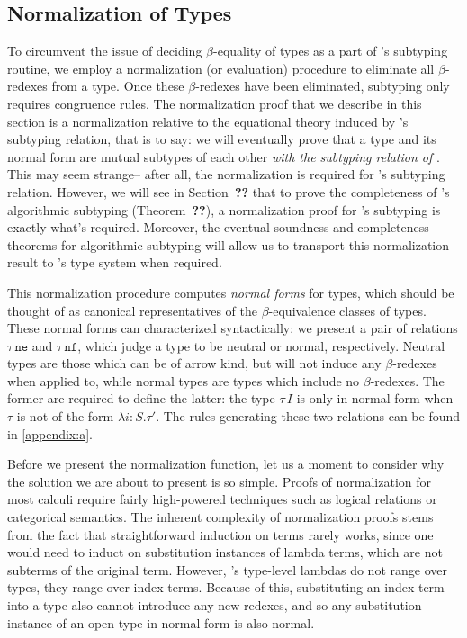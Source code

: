 \subsection{Normalization of Types}
\label{sec:dlambdaamor-normalization}
To circumvent the issue of deciding $\beta$-equality of types as a part of \bilambdaamor's subtyping routine, we employ a normalization (or evaluation) procedure to eliminate all $\beta$-redexes from a type. Once these $\beta$-redexes have been eliminated, subtyping only requires congruence rules. The normalization proof that we describe in this section is a normalization relative to the equational theory induced by \dlambdaamor's subtyping relation, that is to say: we will eventually prove that a type and its normal form are mutual subtypes of each other \textit{with the subtyping relation of \dlambdaamor}. This may seem strange-- after all, the normalization is required for \bilambdaamor's subtyping relation. However, we will see in Section~\textbf{??} that to prove the completeness of \bilambdaamor's algorithmic subtyping (Theorem~\textbf{??}), a normalization proof for \dlambdaamor's subtyping is exactly what's required. Moreover, the eventual soundness and completeness theorems for algorithmic subtyping will allow us to transport this normalization result to \bilambdaamor's type system when required.

This normalization procedure computes \textit{normal forms} for types, which should be thought of as canonical representatives of the $\beta$-equivalence classes of types. These normal forms can characterized syntactically: we present a pair of relations $\tau \, \texttt{ne}$ and $\tau \, \texttt{nf}$, which judge a type to be neutral or normal, respectively. Neutral types are those which can be of arrow kind, but will not induce any $\beta$-redexes when applied to, while normal types are types which include no $\beta$-redexes. The former are required to define the latter: the type $\tau \, I$ is only in normal form when $\tau$ is not of the form $\lambda i : S.\tau'$. The rules generating these two relations can be found in \autoref{appendix:a}.

Before we present the normalization function, let us a moment to consider why the solution we are about to present is so simple. Proofs of normalization for most calculi require fairly high-powered techniques such as logical relations or categorical semantics. The inherent complexity of normalization proofs stems from the fact that straightforward induction on terms rarely works, since one would need to induct on substitution instances of lambda terms, which are not subterms of the original term. However, \dlambdaamor's type-level lambdas do not range over types, they range over index terms. Because of this, substituting an index term into a type also cannot introduce any new redexes, and so any substitution instance of an open type in normal form is also normal.

